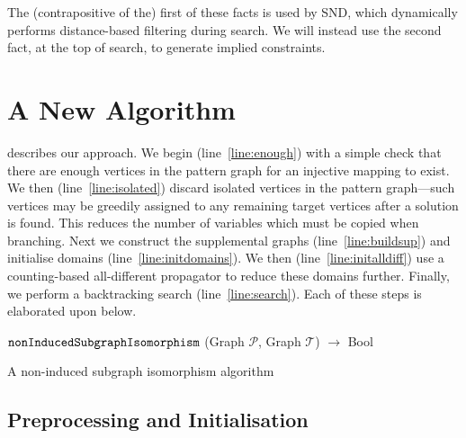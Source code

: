 \documentclass{llncs}
\newcommand{\lineref}[1]{line~\ref{#1}}
\begin{document}
\noindent The (contrapositive of the) first of these facts is used by SND, which dynamically
performs distance-based filtering during search. We will instead use the second fact, at the top of
search, to generate implied constraints.

\section{A New Algorithm}

 describes our approach.  We begin (\lineref{line:enough}) with a simple check
that there are enough vertices in the pattern graph for an injective mapping to exist.  We then
(\lineref{line:isolated}) discard isolated vertices in the pattern graph---such vertices may be
greedily assigned to any remaining target vertices after a solution is found. This reduces the
number of variables which must be copied when branching.  Next we construct the supplemental graphs
(\lineref{line:buildsup}) and initialise domains (\lineref{line:initdomains}). We then
(\lineref{line:initalldiff}) use a counting-based all-different propagator to reduce these domains
further. Finally, we perform a backtracking search (\lineref{line:search}). Each of these steps is
elaborated upon below.

\begin{algorithm}[h]
\DontPrintSemicolon
\nl $\FuncSty{nonInducedSubgraphIsomorphism}$ (Graph $\mathcal{P}$, Graph $\mathcal{T}$) $\rightarrow$ Bool \;
\nl {}

\caption{A non-induced subgraph isomorphism algorithm}
\label{algorithm:sip}
\end{algorithm}

\subsection{Preprocessing and Initialisation}
\end{document}
